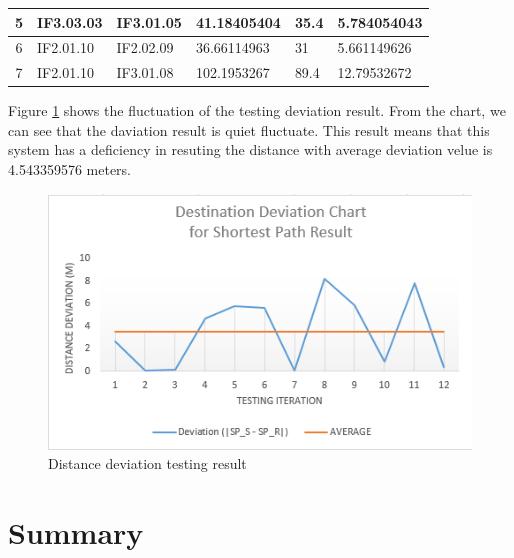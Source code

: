 \begin{table}[h!]
\begin{tabular}{|c|l|l|l|l|l|}
		5            & IF3.03.03                                                    & IF3.01.05                                                         & 41.18405404                                                  & 35.4                                                         & \cellcolor[HTML]{FFFC9E}5.784054043                                                                                        \\ \hline
		\rowcolor[HTML]{FFFFFF} 
		6            & IF2.01.10                                                    & IF2.02.09                                                         & 36.66114963                                                  & 31                                                           & 5.661149626                                                                                        \\ \hline
		7            & IF2.01.10                                                    & IF3.01.08                                                         & 102.1953267                                                  & 89.4                                                         & \cellcolor[HTML]{FFFC9E}12.79532672                                                                                        \\ \hline
	\end{tabular}
\end{table}

Figure \ref{fig:graf3} shows the fluctuation of the testing deviation result. From the chart, we can see that the daviation result is quiet fluctuate. This result means that this system has a deficiency in resuting the distance with average deviation velue is 4.543359576 meters.


\begin{figure}[h!]
	\centering
	\includegraphics[scale=1]{graf4.PNG}
	\caption{Distance deviation testing result 
	}
	\label{fig:graf3}
\end{figure}

\section{Summary}
